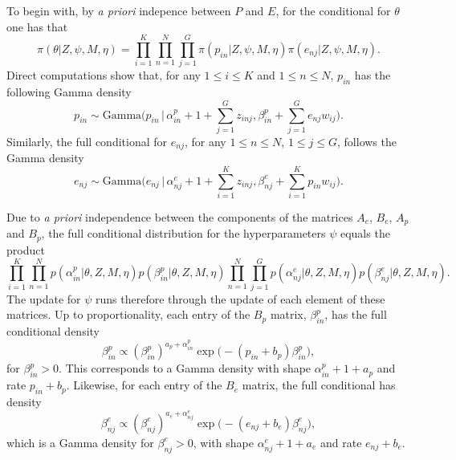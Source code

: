 \documentclass[11pt]{amsart}
\theoremstyle{definition}
\begin{document}
To begin with, by \emph{a priori} indepence between $P$ and $E$, for
the conditional for $\theta$ one has that
\[
   \pi(\theta|Z, \psi, M, \eta)
   =
   \prod_{i=1}^K\prod_{n=1}^N\prod_{j=1}^G
    \pi(p_{in}|Z, \psi, M, \eta)
    \pi(e_{nj}|Z, \psi, M, \eta).
\]
Direct computations show that, for any $1 \leq i\leq K$ and $1\leq
n\leq  N$, $p_{in}$ has the following Gamma density
\begin{equation}
  \label{eqn:Full_for_P}
  p_{in}
       \sim
     \text{Gamma}\Big(p_{in}\,\Big|\, \alpha_{in}^p + 1 +
     \sum_{j=1}^G z_{inj}, \beta_{in}^p +
     \sum_{j=1}^G e_{nj}w_{ij}\Big).\tag{$s_2$}
\end{equation}
Similarly, the full conditional for $e_{nj}$, for any $1\leq n\leq
N$, $1\leq j\leq G$, follows the Gamma density
\begin{equation}
  \label{eqn:Full_for_E}
  e_{nj}
     \sim
   \text{Gamma}\Big(e_{nj}\,\Big|\, \alpha_{nj}^e + 1 +
   \sum_{i=1}^K z_{inj}, \beta_{nj}^e +
   \sum_{i=1}^K p_{in}w_{ij}\Big).\tag{$s_3$}
\end{equation}


Due to \emph{a priori} independence between the
components of the matrices $A_e$, $B_e$, $A_p$ and $B_p$, the full
conditional distribution for the hyperparameters $\psi$ equals the
product
\[
   \prod_{i=1}^K\prod_{n=1}^N
     p(\alpha_{in}^p| \theta, Z, M, \eta)
     p(\beta_{in}^p|\theta, Z, M, \eta)
   \prod_{n=1}^N\prod_{j=1}^G
     p(\alpha_{nj}^e|\theta, Z, M, \eta)
     p(\beta_{nj}^e|\theta, Z, M, \eta).
\]
The update for $\psi$ runs therefore through the update of each
element of these matrices. Up to proportionality, each entry of the
$B_p$ matrix, $\beta_{in}^p$,  has the full conditional density
\begin{equation}
 \label{eqn:Full_for_Bp}
 \beta_{in}^p
   \propto
   (\beta_{in}^p)^{a_p + \alpha_{in}^p}
   \exp\Big(-(p_{in}+b_p)\beta_{in}^p\Big),\tag{$s_4$}
\end{equation}
for $\beta_{in}^p > 0$. This corresponds to a Gamma density with shape
$\alpha_{in}^p + 1 + a_p$ and rate $p_{in} + b_p$.  Likewise, for each
entry of the $B_e$ matrix, the full conditional has density
\begin{equation}
 \label{eqn:Full_for_Be}
 \beta_{nj}^e
   \propto
  (\beta_{nj}^e)^{a_e + \alpha_{nj}^e}
  \exp\Big(-(e_{nj}+b_e)\beta_{nj}^e\Big),\tag{$s_5$}
\end{equation}
which is a  Gamma density for $\beta_{nj}^e > 0$, with shape
$\alpha_{nj}^e + 1+ a_e$ and rate $e_{nj}+b_e$.
\end{document}
